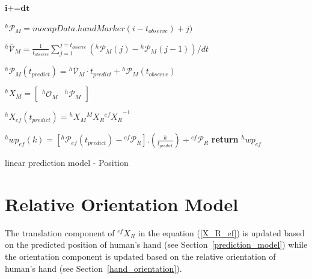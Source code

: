 \documentclass[a4paper, 12pt, oneside]{Thesis}  %
\begin{document}
\begin{algorithm}[H] \label{positionalgo}
	\DontPrintSemicolon
	
	
	
	\textit{$\textbf{i+=dt}$} 
	
	{
		{
			${}^{h}\mathcal{P}_M= \textit{mocapData}.handMarker(i-t_{observe})+j)$	
		}
		
		${}^{h}\mathcal{\bar{V}}_{M} = \frac{1}{t_{observe}}{\sum_{j=1}^{j=t_{observe}} ({}^{h}\mathcal{P}_{M}(j)-{}^{h}\mathcal{P}_{M}(j-1))/dt }$\newline 
		
		${}^{h}\mathcal{P}_M(t_{predict}) = {}^{h}\mathcal{\bar{V}}_{M} \cdot t_{predict}  + {}^{h}\mathcal{P}_{M}(t_{observe})$ %
		
		
		${}^{h}{X}_M= \begin{bmatrix} {}^{h}\mathcal{O}_{M} &  {}^{h}\mathcal{P}_M	\end{bmatrix}$ \newline
		
		${}^{h}{X}_{ef}(t_{predict}) =  {}^{h}{X}_M  {}^{M}{X}_R {{}^{ef}{X}_R}^{-1}$ \newline
		
		
		{
			{
				${}^{h}wp_{ef}(k) = [{}^{h}\mathcal{P}_{ef}(t_{predict}) - {}^{ef}\mathcal{P}_{R}] . (\frac{k}{t_{predict}})  + {}^{ef}\mathcal{P}_{R} $ 
			}	
			\textbf{return} $ {}^{h}wp_{ef} $
		}
	}
	\caption{linear prediction model - Position}
\end{algorithm}


\clearpage
\section{Relative Orientation Model}\label{relOri}
The translation component of ${}^{ef}{X}_R $ in the equation (\ref{X_R_ef}) is updated based on the predicted position of human's hand (see Section~\ref{prediction_model}) while the orientation component is updated based on the relative orientation of human's hand (see Section~\ref{hand_orientation}).
\end{document}
